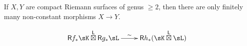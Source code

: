 \begin{theorem}[de Franchis, 1913]
If $X,Y$ are compact Riemann surfaces of genus $\geqslant 2$, then there are 
only finitely many non-constant morphisms $X\to Y$. 
\end{theorem}

\[\xymatrix{
  \mathsf R f_\ast \sK \overset{\mathsf L}{\boxtimes}\mathsf R g_\ast \sL \ar[r]^-\sim 
    & \mathsf Rh_\ast (\sK\overset{\mathsf L}{\boxtimes} \sL) 
}\]









